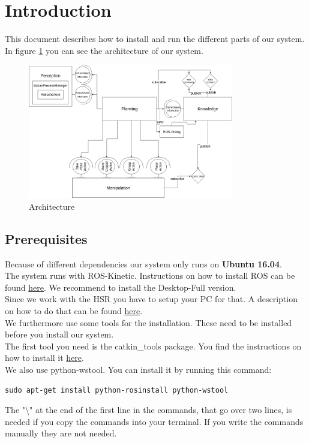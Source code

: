 \documentclass[main.tex]{subfiles}
\begin{document}
\newpage
	\section{Introduction}
	This document describes how to install and run the different parts of our system.\\
	In figure \ref{fig:architecture} you can see the architecture of our system.
	\begin{figure}[h]
\centering
\includegraphics[width=0.8\textwidth]{architecture/architecture}
\caption{Architecture}
\label{fig:architecture}
\end{figure}
	
	\subsection{Prerequisites}
	
	Because of different dependencies our system only runs on \textbf{Ubuntu 16.04}.\\
	The system runs with ROS-Kinetic. Instructions on how to install ROS can be found \href{http://wiki.ros.org/kinetic/Installation/Ubuntu}{here}. We recommend to install the Desktop-Full version.\\
	Since we work with the HSR you have to setup your PC for that.
	A description on how to do that can be found \href{https://docs.hsr.io/manual_en/howto/pc_install.html}{here}.\\
	We furthermore use some tools for the installation. These need to be installed before you install our system.\\
	The first tool you need is the catkin\_tools package. You find the instructions on how to install it \href{https://catkin-tools.readthedocs.io/en/latest/installing.html}{here}.\\
	We also use python-wstool.
	You can install it by running this command:
	\begin{lstlisting}
sudo apt-get install python-rosinstall python-wstool
\end{lstlisting}
The "\textbackslash" at the end of the first line in the commands, that go over two lines, is needed if you copy the commands into your terminal. If you write the commands manually they are not needed.
	
\end{document}
